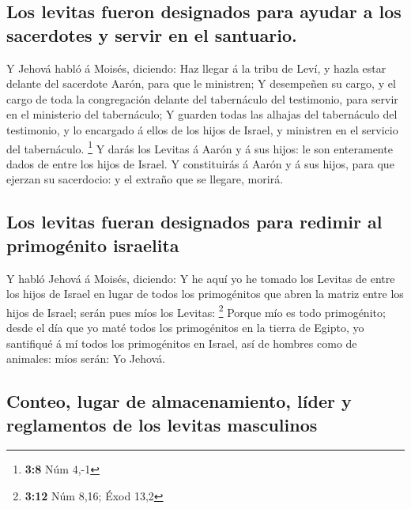 \hypertarget{los-levitas-fueron-designados-para-ayudar-a-los-sacerdotes-y-servir-en-el-santuario.}{%
\subsection{Los levitas fueron designados para ayudar a los sacerdotes y
servir en el
santuario.}\label{los-levitas-fueron-designados-para-ayudar-a-los-sacerdotes-y-servir-en-el-santuario.}}

 Y Jehová habló á Moisés, diciendo:  Haz llegar
á la tribu de Leví, y hazla estar delante del sacerdote Aarón, para que
le ministren;  Y desempeñen su cargo, y el cargo de toda la
congregación delante del tabernáculo del testimonio, para servir en el
ministerio del tabernáculo;  Y guarden todas las alhajas del
tabernáculo del testimonio, y lo encargado á ellos de los hijos de
Israel, y ministren en el servicio del tabernáculo. \footnote{\textbf{3:8}
  Núm 4,-1}  Y darás los Levitas á Aarón y á sus hijos: le
son enteramente dados de entre los hijos de Israel.  Y
constituirás á Aarón y á sus hijos, para que ejerzan su sacerdocio: y el
extraño que se llegare, morirá.

\hypertarget{los-levitas-fueran-designados-para-redimir-al-primoguxe9nito-israelita}{%
\subsection{Los levitas fueran designados para redimir al primogénito
israelita}\label{los-levitas-fueran-designados-para-redimir-al-primoguxe9nito-israelita}}

 Y habló Jehová á Moisés, diciendo:  Y he aquí
yo he tomado los Levitas de entre los hijos de Israel en lugar de todos
los primogénitos que abren la matriz entre los hijos de Israel; serán
pues míos los Levitas: \footnote{\textbf{3:12} Núm 8,16; Éxod 13,2}
 Porque mío es todo primogénito; desde el día que yo maté
todos los primogénitos en la tierra de Egipto, yo santifiqué á mí todos
los primogénitos en Israel, así de hombres como de animales: míos serán:
Yo Jehová.

\hypertarget{conteo-lugar-de-almacenamiento-luxedder-y-reglamentos-de-los-levitas-masculinos}{%
\subsection{Conteo, lugar de almacenamiento, líder y reglamentos de los
levitas
masculinos}\label{conteo-lugar-de-almacenamiento-luxedder-y-reglamentos-de-los-levitas-masculinos}}

